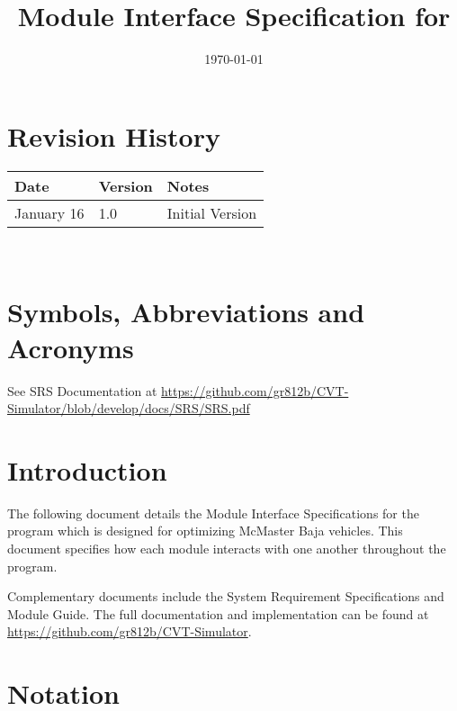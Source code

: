 \documentclass[12pt, titlepage]{article}
\begin{document}
\title{Module Interface Specification for \progname{}}

\author{\authname}

\date{\today}

\maketitle


\section{Revision History}

\begin{tabularx}{\textwidth}{p{3cm}p{2cm}X}
\toprule {\bf Date} & {\bf Version} & {\bf Notes}\\
\midrule
January 16 & 1.0 & Initial Version\\
\bottomrule
\end{tabularx}

~\newpage

\section{Symbols, Abbreviations and Acronyms}

See SRS Documentation at \url{https://github.com/gr812b/CVT-Simulator/blob/develop/docs/SRS/SRS.pdf}

\newpage

\tableofcontents

\newpage


\section{Introduction}

The following document details the Module Interface Specifications for
the \progname program which is designed for optimizing McMaster Baja vehicles. 
This document specifies how each module interacts with one another throughout the program. 

Complementary documents include the System Requirement Specifications
and Module Guide.  The full documentation and implementation can be
found at \url{https://github.com/gr812b/CVT-Simulator}.

\section{Notation}
\end{document}
